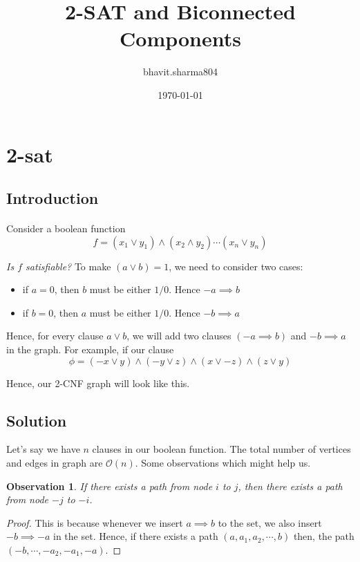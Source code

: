 \documentclass{article}
\title{2-SAT and Biconnected Components}
\author{bhavit.sharma804 }
\date{\today}
\newtheorem{observation}{Observation}[section]
\theoremstyle{definition}
\begin{document}
\maketitle
\tableofcontents

\section{2-sat}
\subsection{Introduction}
\paragraph{} Consider a boolean function
\[
	f = (x_1 \lor y_1)\land(x_2 \land y_2) \cdots (x_n \lor y_n)
\]

\par \textit{Is $f$ satisfiable?}
To make $(a \lor b) = 1$, we need to consider two cases:
\begin{itemize}
	\item if $a = 0$, then $b$ must be either $1/0$. Hence $-a \implies b$
	\item if $b = 0$, then $a$ must be either $1/0$. Hence $-b \implies a$
\end{itemize}

Hence, for every clause $a \lor b$, we will add two clauses $(-a \implies b)$ and $-b \implies a$
in the graph. For example, if our clause
\[
    \phi = (-x \lor y) \land (-y \lor z) \land (x \lor -z) \land (z \lor y)
\]

Hence, our 2-CNF graph will look like this.\\

\subsection{Solution}
Let's say we have $n$ clauses in our boolean function. The total number of vertices and edges in
graph are $\mathcal{O}(n)$. Some observations which might help us.

\begin{observation}
    \label{Obs1}
    If there exists a path from node $i$ to $j$, then there exists a path from node
    $-j$ to $-i$.
\end{observation}

\begin{proof}
    This is because whenever we insert $a \implies b$ to the set, we also insert
    $-b \implies -a$ in the set. Hence, if there exists a path $(a, a_1, a_2, \cdots, b)$
    then, the path $(-b, \cdots, -a_2, -a_1, -a)$.
\end{proof}
\end{document}
